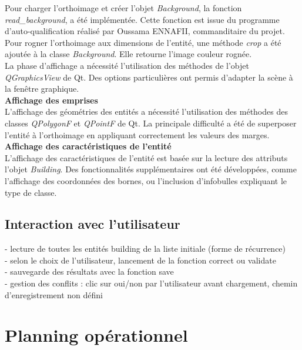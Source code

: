 Pour charger l'orthoimage et créer l'objet \textit{Background}, la fonction \textit{read\_background},  a été implémentée. Cette fonction est issue du programme  d'auto-qualification réalisé par Oussama ENNAFII, commanditaire du projet. Pour rogner l'orthoimage aux dimensions de l'entité, une méthode \textit{crop} a été ajoutée à la classe \textit{Background}. Elle retourne l'image couleur rognée.\\

La phase d'affichage a nécessité l'utilisation des méthodes de l'objet \textit{QGraphicsView} de Qt. Des options particulières ont permis d'adapter la scène à la fenêtre graphique.\\

\noindent\textbf{Affichage des emprises}\\

L'affichage des géométries des entités a nécessité l'utilisation des méthodes des classes \textit{QPolygonF} et \textit{QPointF} de Qt. La principale difficulté a été de superposer l'entité à l'orthoimage en appliquant correctement les valeurs des marges.\\

\noindent\textbf{Affichage des caractéristiques de l'entité}\\

L'affichage des caractéristiques de l'entité est basée sur la lecture des attributs l'objet \textit{Building}. Des fonctionnalités supplémentaires ont été développées, comme l'affichage des coordonnées des bornes, ou l'inclusion d'infobulles expliquant le type de classe.

\subsection{Interaction avec l'utilisateur}

- lecture de toutes les entités building de la liste initiale (forme de récurrence)\\
- selon le choix de l'utilisateur, lancement de la fonction correct ou validate\\
- sauvegarde des résultats avec la fonction save\\
- gestion des conflits : clic sur oui/non par l'utilisateur avant chargement, chemin d'enregistrement non défini

\section{Planning opérationnel}




